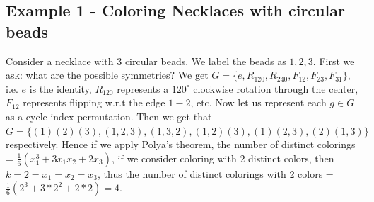 \subsection{Example 1 - Coloring Necklaces with circular beads}
Consider a necklace with $3$ circular beads. We label the beads as $1, 2, 3$. First we ask: what are the possible symmetries? We get $G = \{e, R_{120}, R_{240}, F_{12}, F_{23}, F_{31}\}$, i.e. $e$ is the identity, $R_{120}$ represents a $120^{\circ}$ clockwise rotation through the center, $F_{12}$ represents flipping w.r.t the edge $1-2$, etc. Now let us represent each $g \in G$ as a cycle index permutation. Then we get that $G = \{(1)(2)(3), (1, 2, 3), (1, 3, 2), (1, 2)(3), (1)(2, 3), (2)(1, 3)\}$ respectively. Hence if we apply Polya's theorem, the number of distinct colorings = $\frac{1}{6} (x_1^3 + 3x_1x_2 + 2x_3)$, if we consider coloring with $2$ distinct colors, then $k = 2 = x_1 = x_2 = x_3$, thus the number of distinct colorings with 2 colors = $\frac{1}{6} (2^3 + 3*2^2 + 2*2) = 4$.

